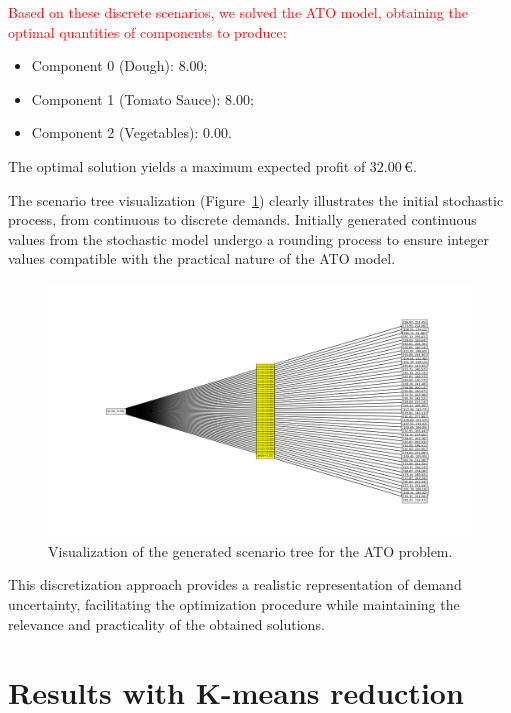 \documentclass[a4paper,12pt]{article}
\begin{document}
	\textcolor{red}{Based on these discrete scenarios, we solved the ATO model, obtaining the optimal quantities of components to produce:}
	
	\begin{itemize}
		\item Component 0 (Dough): \(8.00\);
		\item Component 1 (Tomato Sauce): \(8.00\);
		\item Component 2 (Vegetables): \(0.00\).
	\end{itemize}
	
	The optimal solution yields a maximum expected profit of \(32.00\)\,€.
	
	\newpage
 The scenario tree visualization (Figure~\ref{fig:ato-scenariotree}) clearly illustrates the initial stochastic process, from continuous to discrete demands. Initially generated continuous values from the stochastic model undergo a rounding process to ensure integer values compatible with the practical nature of the ATO model.
	
	\begin{figure}[htbp]
		\centering
		\includegraphics[width=1\textwidth]{../immagini/scenariATO.png}
		\caption{Visualization of the generated scenario tree for the ATO problem.}
		\label{fig:ato-scenariotree}
	\end{figure}
	
	\noindent This discretization approach provides a realistic representation of demand uncertainty, facilitating the optimization procedure while maintaining the relevance and practicality of the obtained solutions.
	
	
	\section{Results with K-means reduction}
	
\end{document}
